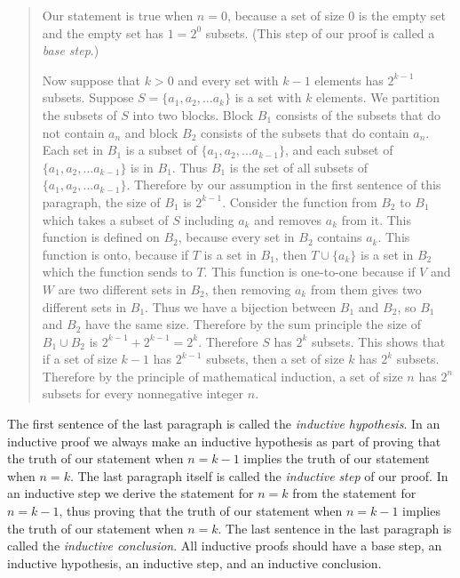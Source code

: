 \begin{quote}Our statement
is true when $n=0$, because a set of size 0 is the empty set and the
empty set has $1=2^0$ subsets. (This step of our proof is called a {\em
base step}.)

Now suppose that $k>0$ and every set with $k-1$ elements has $2^{k-1}$
subsets.  Suppose $S=\{a_1,a_2,\ldots a_k\}$ is a set with $k$ elements. 
We partition the subsets of $S$ into two blocks.  Block $B_1$ consists of
the subsets that do not contain $a_n$ and block $B_2$ consists of the
subsets that do contain $a_n$.  Each set in $B_1$ is a subset of
$\{a_1,a_2,\ldots a_{k-1}\}$, and each subset of $\{a_1,a_2, \ldots
a_{k-1}\}$ is in $B_1$.  Thus $B_1$ is the set of all subsets of
$\{a_1,a_2,\ldots a_{k-1}\}$.  Therefore by our assumption in the first
sentence of this paragraph, the size of $B_1$ is $2^{k-1}$.  Consider the
function from $B_2$ to $B_1$ which takes a subset of $S$ including $a_k$
and removes $a_k$ from it.  This function is defined on $B_2$, because
every set in $B_2$ contains $a_k$.  This function is onto, because if
$T$ is a set in $B_1$, then $T\cup \{a_k\}$ is a set in $B_2$ which the
function sends to $T$.  This function is one-to-one because if $V$ and
$W$ are two different sets in $B_2$, then removing $a_k$ from them gives
two different sets in $B_1$.  Thus we have a bijection between $B_1$ and
$B_2$, so $B_1$ and $B_2$ have the same size.  Therefore by the sum
principle the size of
$B_1\cup B_2$ is $2^{k-1} +2^{k-1}=2^k$.  Therefore $S$ has $2^k$
subsets.  This shows that if a set of size $k-1$ has $2^{k-1}$ subsets,
then a set of size $k$ has $2^k$ subsets.  Therefore by the principle of
mathematical induction, a set of size $n$ has $2^n$ subsets for every
nonnegative integer $n$.
\end{quote}

The first sentence of the last paragraph is called the {\em inductive
hypothesis}.  In an inductive proof we always make an inductive
hypothesis as part of proving that the truth of our statement when
$n=k-1$ implies the truth of our statement when $n=k$.  The last
paragraph itself is called the {\em inductive step} of our proof.  In an
inductive step we derive the statement for $n=k$ from the statement for
$n=k-1$, thus proving that the truth of our statement when $n=k-1$
implies the truth of our statement when $n=k$.  The last sentence in the
last paragraph is called the {\em inductive conclusion}.  All inductive
proofs should have a base step, an inductive hypothesis, an inductive
step, and an inductive conclusion.  

